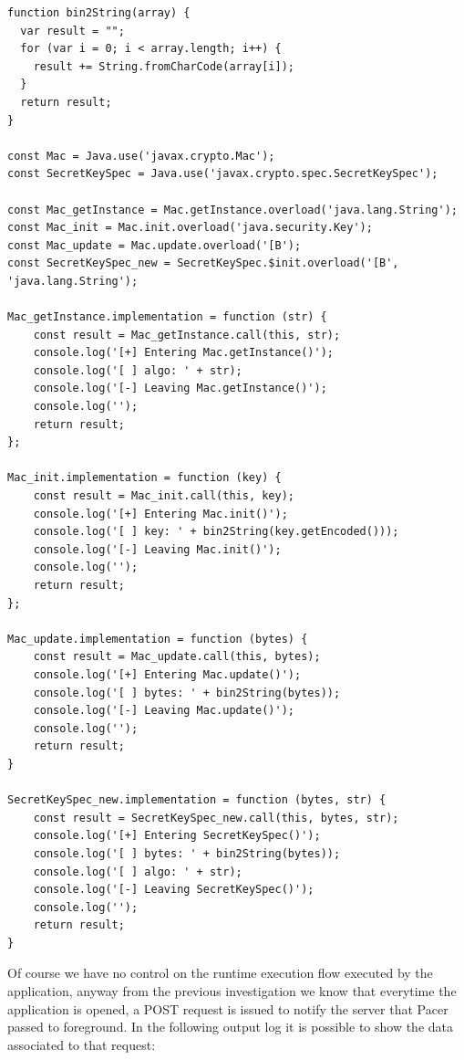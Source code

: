 \begin{lstlisting}
function bin2String(array) {
  var result = "";
  for (var i = 0; i < array.length; i++) {
    result += String.fromCharCode(array[i]);
  }
  return result;
}

const Mac = Java.use('javax.crypto.Mac');
const SecretKeySpec = Java.use('javax.crypto.spec.SecretKeySpec');

const Mac_getInstance = Mac.getInstance.overload('java.lang.String');
const Mac_init = Mac.init.overload('java.security.Key');
const Mac_update = Mac.update.overload('[B');
const SecretKeySpec_new = SecretKeySpec.$init.overload('[B', 'java.lang.String');

Mac_getInstance.implementation = function (str) {
	const result = Mac_getInstance.call(this, str);
	console.log('[+] Entering Mac.getInstance()');
	console.log('[ ] algo: ' + str);
	console.log('[-] Leaving Mac.getInstance()');
	console.log('');
	return result;
};

Mac_init.implementation = function (key) {
	const result = Mac_init.call(this, key);
	console.log('[+] Entering Mac.init()');
	console.log('[ ] key: ' + bin2String(key.getEncoded()));
	console.log('[-] Leaving Mac.init()');
	console.log('');
	return result;
};

Mac_update.implementation = function (bytes) {
	const result = Mac_update.call(this, bytes);
	console.log('[+] Entering Mac.update()');
	console.log('[ ] bytes: ' + bin2String(bytes));
	console.log('[-] Leaving Mac.update()');
	console.log('');
	return result;
}

SecretKeySpec_new.implementation = function (bytes, str) {
	const result = SecretKeySpec_new.call(this, bytes, str);
	console.log('[+] Entering SecretKeySpec()');
	console.log('[ ] bytes: ' + bin2String(bytes));
	console.log('[ ] algo: ' + str);
	console.log('[-] Leaving SecretKeySpec()');
	console.log('');
	return result;
}
\end{lstlisting}
			Of course we have no control on the runtime execution flow executed by the application, anyway from the previous investigation we know that everytime the application is opened, a POST request is issued to notify the server that Pacer passed to foreground. In the following output log it is possible to show the data associated to that request:
